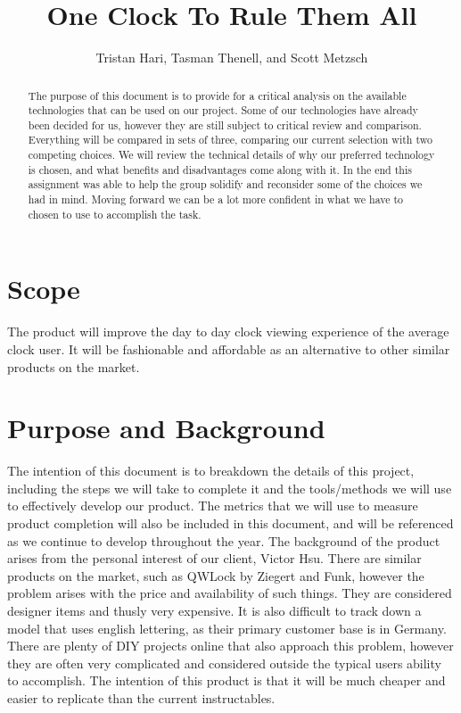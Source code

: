 \documentclass[10pt,draftclsnofoot,onecolumn]{IEEEtran}
\begin{document}
\title{One Clock To Rule Them All}
\author{Tristan Hari, Tasman Thenell, and Scott Metzsch}
\maketitle
\begin{abstract}
The purpose of this document is to provide for a critical analysis on the available technologies that can be used on our project.
Some of our technologies have already been decided for us, however they are still subject to critical review and comparison.
Everything will be compared in sets of three, comparing our current selection with two competing choices.
We will review the technical details of why our preferred technology is chosen, and what benefits and disadvantages come along with it.
In the end this assignment was able to help the group solidify and reconsider some of the choices we had in mind.
Moving forward we can be a lot more confident in what we have to chosen to use to accomplish the task.
\end{abstract}

\newpage

\section{Scope}
The product will improve the day to day clock viewing experience of the average clock user.
It will be fashionable and affordable as an alternative to other similar products on the market.

\section{Purpose and Background}
The intention of this document is to breakdown the details of this project, including the steps we will take to complete it and the tools/methods we will use to effectively develop our product.
The metrics that we will use to measure product completion will also be included in this document, and will be referenced as we continue to develop throughout the year.
The background of the product arises from the personal interest of our client, Victor Hsu.
There are similar products on the market, such as QWLock by Ziegert and Funk, however the problem arises with the price and availability of such things.
They are considered designer items and thusly very expensive.
It is also difficult to track down a model that uses english lettering, as their primary customer base is in Germany.
There are plenty of DIY projects online that also approach this problem, however they are often very complicated and considered outside the typical users ability to accomplish.
The intention of this product is that it will be much cheaper and easier to replicate than the current instructables.

\newpage
\end{document}
